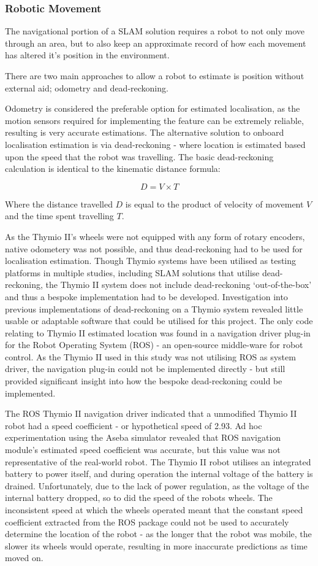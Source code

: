 \subsubsection{Robotic Movement}
The navigational portion of a SLAM solution requires a robot to not only move
through an area, but to also keep an approximate record of how each movement
has altered it's position in the environment.

There are two main approaches to allow a robot to estimate is position
without external aid; odometry and dead-reckoning.

Odometry is considered the preferable option for estimated localisation, as
the motion sensors required for implementing the feature can be extremely
reliable, resulting is very accurate estimations.
The alternative solution to onboard localisation estimation is via
dead-reckoning - where location is estimated based upon the speed that the
robot was travelling.
The basic dead-reckoning calculation is identical to the kinematic
distance formula:

\[ D = V \times T \]

Where the distance travelled \(D\) is equal to the product of velocity of
movement \(V\) and the time spent travelling \(T\).

As the Thymio II's wheels were not equipped with any form of rotary encoders,
native odometery was not possible, and thus dead-reckoning had to be used for
localisation estimation.
Though Thymio systems have been utilised as testing platforms in multiple
studies, including SLAM solutions that utilise dead-reckoning, the Thymio II
system does not include dead-reckoning `out-of-the-box' and thus a bespoke
implementation had to be developed.
Investigation into previous implementations of dead-reckoning on a Thymio
system revealed little usable or adaptable software that could be utilised for
this project.
The only code relating to Thymio II estimated location was found in a
navigation driver plug-in for the Robot Operating System (ROS) - an open-source
middle-ware for robot control.
As the Thymio II used in this study was not utilising ROS as system driver,
the navigation plug-in could not be implemented directly - but still provided
significant insight into how the bespoke dead-reckoning could be implemented.

The ROS Thymio II navigation driver indicated that a unmodified Thymio II
robot had a speed coefficient - or hypothetical speed of 2.93.
Ad hoc experimentation using the Aseba simulator revealed that ROS navigation
module's estimated speed coefficient was accurate, but this value was not
representative of the real-world robot.
The Thymio II robot utilises an integrated battery to power itself, and
during operation the internal voltage of the battery is drained.
Unfortunately, due to the lack of power regulation, as the voltage of the
internal battery dropped, so to did the speed of the robots wheels.
The inconsistent speed at which the wheels operated meant that the
constant speed coefficient extracted from the ROS package could not be used to
accurately determine the location of the robot - as the longer that the robot
was mobile, the slower its wheels would operate, resulting in more inaccurate
predictions as time moved on.

